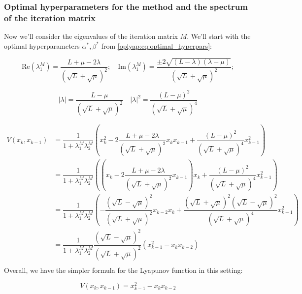 \documentclass[a4paper,11pt]{article}
\begin{document}
\subsubsection{Optimal hyperparameters for the method and the spectrum of the iteration matrix}

Now we’ll consider the eigenvalues of the iteration matrix $M$. We’ll start with the optimal hyperparameters $\alpha^*, \beta^*$ from \eqref{oplyap:eq:optimal_hyperpars}:

\begin{equation}
 \text{Re}(\lambda^M_1) = \dfrac{L + \mu - 2\lambda}{(\sqrt{L} + \sqrt{\mu})^2}; \quad \text{Im}(\lambda^M_1) = \dfrac{\pm 2\sqrt{(L - \lambda)(\lambda - \mu)}}{(\sqrt{L} + \sqrt{\mu})^2}; 
\end{equation}

\begin{equation}
 \vert \lambda \vert = \dfrac{L - \mu}{(\sqrt{L} + \sqrt{\mu})^2} \quad \vert \lambda \vert^2 = \dfrac{(L - \mu)^2}{(\sqrt{L} + \sqrt{\mu})^4}
\end{equation}

\begin{equation}
 \begin{split}
 V(x_k, x_{k-1})&= \dfrac{1}{1 + \lambda^M_1\lambda^M_2} \left(x_k^2 - 2 \dfrac{L + \mu - 2\lambda}{(\sqrt{L} + \sqrt{\mu})^2} x_k x_{k-1} + \dfrac{(L - \mu)^2}{(\sqrt{L} + \sqrt{\mu})^4}x_{k-1}^2\right) \\
 &= \dfrac{1}{1 + \lambda^M_1\lambda^M_2} \left( \left( x_k - 2 \dfrac{L + \mu - 2\lambda}{(\sqrt{L} + \sqrt{\mu})^2} x_{k-1}\right)x_k + \dfrac{(L - \mu)^2}{(\sqrt{L} + \sqrt{\mu})^4}x_{k-1}^2\right) \\
 &= \dfrac{1}{1 + \lambda^M_1\lambda^M_2} \left( -\dfrac{(\sqrt{L} - \sqrt{\mu})^2}{(\sqrt{L} + \sqrt{\mu})^2}x_{k-2}x_k + \dfrac{(\sqrt{L} + \sqrt{\mu})^2(\sqrt{L} - \sqrt{\mu})^2}{(\sqrt{L} + \sqrt{\mu})^4}x_{k-1}^2\right) \\
 &= \dfrac{1}{1 + \lambda^M_1\lambda^M_2} \dfrac{(\sqrt{L} - \sqrt{\mu})^2}{(\sqrt{L} + \sqrt{\mu})^2} \left( x_{k-1}^2 - x_k x_{k-2}\right) \\
 \end{split}
\end{equation}
Overall, we have the simpler formula for the Lyapunov function in this setting:

\begin{equation}
 \label{oplyap:eq:basest}
 V(x_k, x_{k-1}) = x_{k-1}^2 - x_k x_{k-2}
\end{equation}
\end{document}
